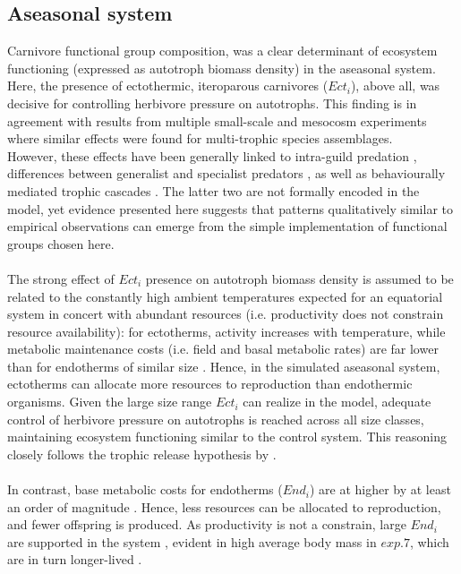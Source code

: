 \subsection{Aseasonal system}
Carnivore functional group composition, was a clear determinant of ecosystem functioning (expressed as autotroph biomass density) in the aseasonal system. Here, the presence of ectothermic, iteroparous carnivores ($Ect_i$), above all, was decisive for controlling herbivore pressure on autotrophs. This finding is in agreement with results from multiple small-scale and mesocosm experiments \citep[e.g.][]{Finke2005, OConnor2008, Sanders2011} where similar effects were found for multi-trophic species assemblages.\\
However, these effects have been generally linked to intra-guild predation \citep{Ives2005}, differences between  generalist and specialist predators \citep{Duffy2007}, as well as behaviourally mediated trophic cascades \citep{Beschta2009, Schmitz2015}. 
The latter two are not formally encoded in the model, yet evidence presented here suggests that patterns qualitatively similar to empirical observations can emerge from the simple implementation of functional groups chosen here.
\\\\
The strong effect of $Ect_i$ presence on autotroph biomass density is assumed to be related to the constantly high ambient temperatures expected for an equatorial system in concert with abundant resources (i.e. productivity does not constrain resource availability): for ectotherms, activity increases with temperature, while metabolic maintenance costs (i.e. field and basal metabolic rates) are  far lower than for endotherms of similar size \citep{Nagy2005,Buckley2012}. 
Hence, in the simulated aseasonal system, ectotherms can allocate more resources to reproduction than endothermic organisms. 
Given the large size range $Ect_i$ can realize in the model,  adequate control of herbivore pressure on autotrophs is reached across all size classes, maintaining ecosystem functioning similar to the control system. 
This reasoning closely follows the trophic release hypothesis by \cite{Hairston1960}. 
\\\\
In contrast, base metabolic costs for endotherms ($End_i$) are at higher by at least an order of magnitude \citep{Nagy2005}. 
Hence, less resources can be allocated to reproduction, and fewer offspring is produced. 
As productivity is not a constrain, large $End_i$ are supported in the system \citep{Smith2011}, evident in high average body mass in $exp. 7$, which are in turn longer-lived \citep{Speakman2005}. 
